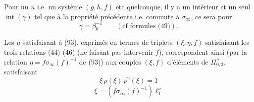 Pour un $u$  \unsure{(}i.e. un système $(g,h,f)$ etc quelconque, il y a un  intérieur et un seul $\operatorname{int}(\gamma)$ tel que   à la propriété précédente i.e. commute à $\sigma_\infty$,  ce sera pour
\[
 \gamma=\beta_0^{-1}\qquad(\text{cf formules (49)}).
\]

Les $u$ satisfaisant à (93), exprimés en termes de triplets $(\xi,\eta,f)$ satisfaisant les trois relations (44) (46) (ne faisant pas intervenir $f$),  correspondent ainsi (par la relation $\eta=f\sigma_\infty(f)^{-1}$ de (93)) aux  couples $(\xi,f)$ d'éléments de $\Pi_{0,3}^{\wedge}$, satisfaisant
\[
\tag{95}
 \xi\,\rho(\xi)\,\rho^2(\xi)=1
\]
\[
\tag{96}
 \xi=(f\sigma_\infty(f)^{-1})\ell_1^\nu
\]

